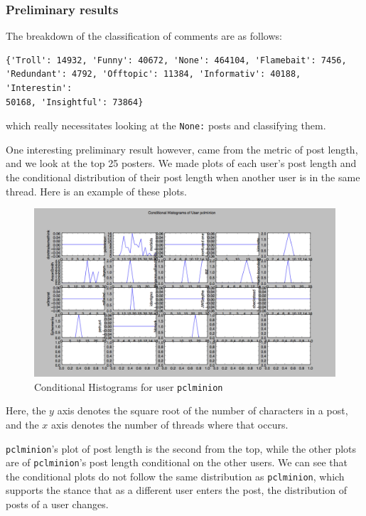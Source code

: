 \documentclass[a4paper,12pt]{article}
\numberwithin{equation}{section}
\begin{document}




\subsubsection*{Preliminary results}

The breakdown of the classification of comments are as follows:
\vspace*{-0.5cm}
\begin{verbatim}
{'Troll': 14932, 'Funny': 40672, 'None': 464104, 'Flamebait': 7456, 
'Redundant': 4792, 'Offtopic': 11384, 'Informativ': 40188, 'Interestin': 
50168, 'Insightful': 73864}
\end{verbatim}
which really necessitates looking at the {\tt None:} posts and classifying them. 

One interesting preliminary result however, came from the metric of post length, and we look at the top 25 posters. We made plots of each user's post length and the conditional distribution of their post length when another user is in the same thread. Here is an example of these plots.

\begin{figure}[here!]
\begin{center}
\includegraphics[width=17cm]{histeg.png}
\caption{Conditional Histograms for user {\tt pclminion}}
\end{center}
\end{figure}

Here, the $y$ axis denotes the square root of the number of characters in a post, and the $x$ axis denotes the number of threads where that occurs.

{\tt pclminion}'s plot of post length is the second from the top, while the other plots are of {\tt pclminion}'s post length conditional on the other users. We can see that the conditional plots do not follow the same distribution as {\tt pclminion}, which supports the stance that as a different user enters the post, the distribution of posts of a user changes.
\end{document}
